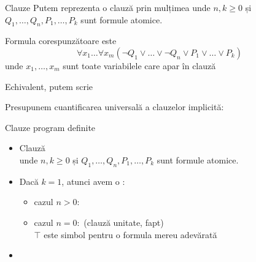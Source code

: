 \documentclass[xcolor=pdftex,romanian,colorlinks]{beamer}
\begin{document}
\begin{frame}{Clauze}
Putem reprezenta o clauză prin mulțimea
unde $n,k\geq 0$ și $Q_1,\ldots, Q_n,P_1,\ldots, P_k$ sunt formule atomice.

\bigskip
Formula corespunzătoare este 
\[\forall x_1\ldots \forall x_m (\neg Q_1\vee\ldots \vee \neg Q_n\vee  P_1\vee \ldots\vee P_k)\]
unde $x_1,\ldots, x_m$ sunt toate variabilele care apar în clauză 

\bigskip
Echivalent, putem scrie 

\vspace{-.4cm}
Presupunem cuantificarea universală a clauzelor implicită:


\end{frame}


\begin{frame}{Clauze program definite}

\begin{itemize}
\item Clauză  \\
unde $n,k\geq 0$ și  $Q_1,\ldots, Q_n,P_1,\ldots, P_k$ sunt formule atomice.

\bigskip   

\item Dacă $k=1$, atunci avem o :

\begin{itemize}
\item cazul $n>0:$ \hspace*{0.3cm}  
\smallskip 
\item cazul $n=0:$ \hspace*{0.3cm}    (clauză unitate, fapt)  \\
$\top$ este simbol pentru o formula mereu adevărată
\smallskip 
\end{itemize}

\bigskip
\item {}

\end{itemize}

\end{frame}
\end{document}

